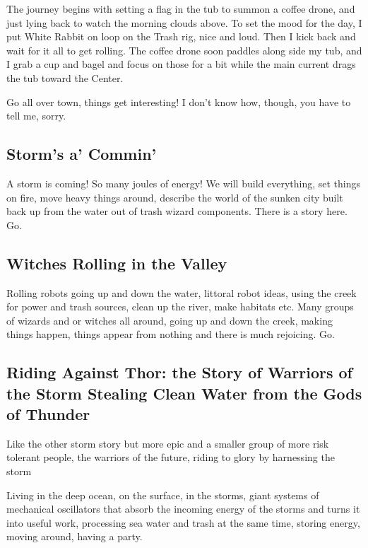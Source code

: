 The journey begins with setting a flag in the tub to summon a coffee
drone, and just lying back to watch the morning clouds above. To set the
mood for the day, I put White Rabbit on loop on the Trash rig, nice and
loud. Then I kick back and wait for it all to get rolling. The coffee
drone soon paddles along side my tub, and I grab a cup and bagel and
focus on those for a bit while the main current drags the tub toward the
Center.

Go all over town, things get interesting! I don't know how, though, you
have to tell me, sorry.

\subsection{Storm's a' Commin'}\label{storms-a-commin}

A storm is coming! So many joules of energy! We will build everything,
set things on fire, move heavy things around, describe the world of the
sunken city built back up from the water out of trash wizard components.
There is a story here. Go.

\subsection{Witches Rolling in the
Valley}\label{witches-rolling-in-the-valley}

Rolling robots going up and down the water, littoral robot ideas, using
the creek for power and trash sources, clean up the river, make habitats
etc. Many groups of wizards and or witches all around, going up and down
the creek, making things happen, things appear from nothing and there is
much rejoicing. Go.

\subsection{Riding Against Thor: the Story of Warriors of the Storm
Stealing Clean Water from the Gods of
Thunder}\label{riding-against-thor-the-story-of-warriors-of-the-storm-stealing-clean-water-from-the-gods-of-thunder}

Like the other storm story but more epic and a smaller group of more
risk tolerant people, the warriors of the future, riding to glory by
harnessing the storm

Living in the deep ocean, on the surface, in the storms, giant systems
of mechanical oscillators that absorb the incoming energy of the storms
and turns it into useful work, processing sea water and trash at the
same time, storing energy, moving around, having a party.

